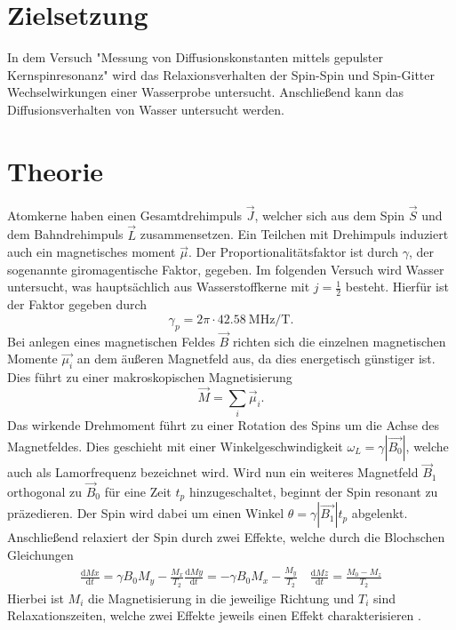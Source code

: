 \section{Zielsetzung}
In dem Versuch "Messung von Diffusionskonstanten mittels gepulster Kernspinresonanz" wird das Relaxionsverhalten der Spin-Spin und Spin-Gitter Wechselwirkungen einer Wasserprobe untersucht.
Anschließend kann das Diffusionsverhalten von Wasser untersucht werden.
\section{Theorie}
Atomkerne haben einen Gesamtdrehimpuls $\vec{J}$, welcher sich aus dem Spin $\vec{S}$ und dem Bahndrehimpuls $\vec{L}$ zusammensetzen.
Ein Teilchen mit Drehimpuls induziert auch ein magnetisches moment $\vec{\mu}$. Der Proportionalitätsfaktor ist durch $\gamma$, der sogenannte giromagentische Faktor, gegeben.
Im folgenden Versuch wird Wasser untersucht, was hauptsächlich aus Wasserstoffkerne mit $ j = \frac{1}{2}$ besteht.
Hierfür ist der Faktor \cite{wiki} gegeben durch 
\begin{equation*}
    \gamma_p = 2 \pi \cdot \SI{42.58}{\mega\hertz\per\tesla}.
\end{equation*} 
Bei anlegen eines magnetischen Feldes $\vec{B}$ richten sich die einzelnen magnetischen Momente $\vec{\mu_i}$ an dem äußeren Magnetfeld aus, da dies energetisch günstiger ist.
Dies führt zu einer makroskopischen Magnetisierung 
\begin{equation*}
    \vec{M} = \sum_i \vec{\mu}_i.
\end{equation*}
Das wirkende Drehmoment führt zu einer Rotation des Spins um die Achse des Magnetfeldes. Dies geschieht mit einer Winkelgeschwindigkeit $\omega_L = \gamma |\vec{B_0}|$, welche auch als Lamorfrequenz bezeichnet wird.
Wird nun ein weiteres Magnetfeld $\vec{B}_1 $ orthogonal zu $\vec{B}_0$ für eine Zeit $t_p$ hinzugeschaltet, beginnt der Spin resonant zu präzedieren. 
Der Spin wird dabei um einen Winkel $\theta = \gamma |\vec{B_1}| t_p$ abgelenkt. Anschließend relaxiert der Spin durch zwei Effekte, welche durch die Blochschen Gleichungen 
\begin{align}
    \frac{\mathrm{d}Mx}{\mathrm{d}t} = \gamma B_0 M_y - \frac{M_x}{T_2}      \frac{\mathrm{d}My}{\mathrm{d}t} = -\gamma B_0 M_x - \frac{M_y}{T_2}  \quad     \frac{\mathrm{d}Mz}{\mathrm{d}t} =  \frac{M_0 - M_z}{T_2} 
\end{align}  
Hierbei ist $M_i $ die Magnetisierung in die jeweilige Richtung und $T_i$ sind Relaxationszeiten, welche zwei Effekte jeweils einen Effekt charakterisieren .
